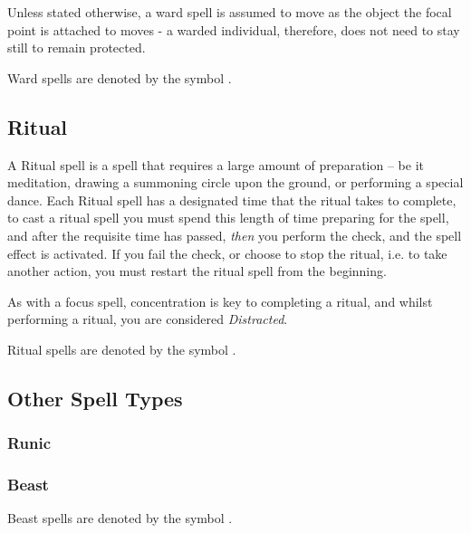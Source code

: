 Unless stated otherwise, a ward spell is assumed to move as the object the focal point is attached to moves - a warded individual, therefore, does not need to stay still to remain protected. 

Ward spells are denoted by the symbol \wardSymb.

\subsection{Ritual}

A Ritual spell is a spell that requires a large amount of preparation -- be it meditation, drawing a summoning circle upon the ground, or performing a special dance. Each Ritual spell has a designated time that the ritual takes to complete, to cast a ritual spell you must spend this length of time preparing for the spell, and after the requisite time has passed, {\it then} you perform the check, and the spell effect is activated. If you fail the check, or choose to stop the ritual, i.e. to take another action, you must restart the ritual spell from the beginning. 

As with a focus spell, concentration is key to completing a ritual, and whilst performing a ritual, you are considered {\it Distracted}. 

Ritual spells are denoted by the symbol \ritSymb.


\subsection{Other Spell Types}

\subsubsection{Runic}



\subsubsection{Beast}

Beast spells are denoted by the symbol \beastSymb.
